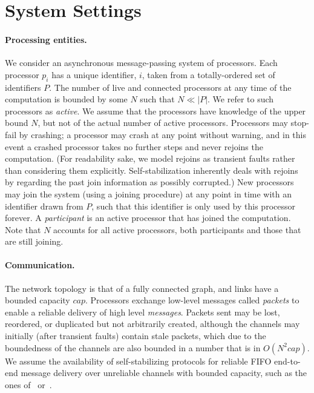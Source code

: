 \documentclass[11pt]{article}
\begin{document}
\section{System Settings}\label{sec:settings} \label{s:sys}
\paragraph{Processing entities.} We consider an asynchronous message-passing system of processors. 
Each processor $p_i$ has a unique identifier, $i$, taken from a totally-ordered set of identifiers $P$. 
The number of live and connected processors at any time of the computation is bounded by some $N$ such that $N \ll |P|$.  We refer to such processors as \emph{active}. 
We assume that the processors have knowledge of the upper bound $N$, but not of the actual number of active processors.
Processors may stop-fail by crashing; a processor may crash at any point without warning, and in this event a crashed processor takes no further steps and never rejoins the computation. 
(For readability sake, we model rejoins as transient faults rather than considering them explicitly. 
Self-stabilization inherently deals with rejoins by regarding the past join information as possibly corrupted.)
New processors may join the system (using a joining procedure) at any point in time with an identifier drawn from $P$, such that this identifier is only used by this processor forever.
A \emph{participant} is an active processor that has joined the computation.
Note that $N$ accounts for all active processors, both participants and those that are still joining. \vspace{.3em}



\paragraph{Communication.} The network topology is that of a fully connected graph, and links have a bounded capacity $cap$.
Processors exchange low-level messages called \emph{packets} to enable a reliable delivery of high level
\emph{messages}. 
Packets sent may be lost, reordered, or duplicated but not arbitrarily created, although the channels may initially (after transient faults) contain stale packets, which due to the boundedness of the channels are also bounded in a number that is in $O(N^2cap)$.
We assume the availability of self-stabilizing protocols for reliable FIFO end-to-end message delivery over unreliable channels with bounded capacity, such as the ones of~\cite{DBLP:journals/ipl/DolevDPT11} or~\cite{DBLP:conf/sss/DolevHSS12}.
\end{document}
